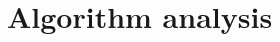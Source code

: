 \documentclass[moon, nosides, colormath]{lecturenotes}
\begin{document}
    \section{Algorithm analysis}
    
\end{document}
